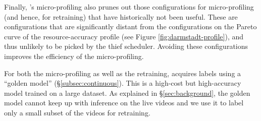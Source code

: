 Finally, {\name}'s micro-profiling also prunes out those configurations for micro-profiling (and hence, for retraining) that have historically not been useful. These are configurations that are significantly distant from the configurations on the Pareto curve of the resource-accuracy profile (see Figure \ref{fig:darmstadt-profile}), and thus unlikely to be picked by the thief scheduler.
 Avoiding these configurations improves the efficiency of the micro-profiling. 

For both the micro-profiling as well as the retraining, {\name} acquires labels using a ``golden model'' (\S\ref{subsec:continuous}). This is a high-cost but high-accuracy model trained on a large dataset. %
As explained in \S\ref{sec:background}, the golden model cannot keep up with inference on the live videos and we use it to label only a small subset of the videos for retraining. 


